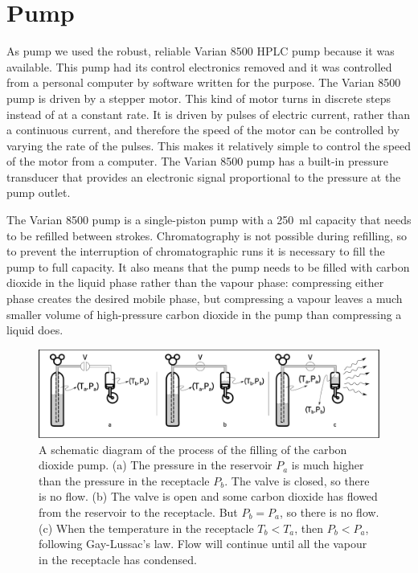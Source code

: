 \section{Pump}
\label{sec:CO2Pump}

As pump we used the robust, reliable Varian 8500 HPLC pump because it was
available. This pump had its control electronics removed and it was controlled
from a personal computer by software written for the purpose. The Varian 8500
pump is driven by a stepper motor. This kind of motor turns in discrete steps
instead of at a constant rate. It is driven by pulses of electric current,
rather than a continuous current, and therefore the speed of the motor can be
controlled by varying the rate of the pulses. This makes it relatively simple to
control the speed of the motor from a computer. The Varian 8500 pump has a
built-in pressure transducer that provides an electronic signal proportional to
the pressure at the pump outlet.

The Varian 8500 pump is a single-piston pump with a \SI{250}{\milli\litre}
capacity that needs to be refilled between strokes. Chromatography is not
possible during refilling, so to prevent the interruption of chromatographic
runs it is necessary to fill the pump to full capacity. It also means that the
pump needs to be filled with carbon dioxide in the liquid phase rather than the
vapour phase: compressing either phase creates the desired mobile phase,
but compressing a vapour leaves a much smaller volume of high-pressure carbon
dioxide in the pump than compressing a liquid does.
 
\begin{figure}
\centering
\includegraphics[width=\textwidth]{Figures/CO2Filling.pdf}
\decoRule

\caption[Filling a CO\textsubscript{2} pump.]{A schematic diagram of the process
of the filling of the carbon dioxide pump. (a) The pressure in the reservoir
\(P_a\) is much higher than the pressure in the receptacle \(P_b\). The valve is
closed, so there is no flow. (b) The valve is open and some carbon dioxide has
flowed from the reservoir to the receptacle. But \(P_b = P_a\), so there is no
flow. (c) When the temperature in the receptacle \(T_b < T_a\), then \(P_b  < P_a\),
following Gay-Lussac's law. Flow will continue until all the vapour in the
receptacle has condensed.}

\label{fig:co2fill}
\end{figure}


